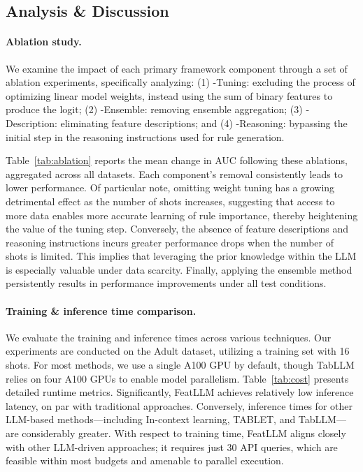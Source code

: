 \subsection{Analysis \& Discussion}
\label{sec:analysis}
\paragraph{Ablation study.} We examine the impact of each primary framework component through a set of ablation experiments, specifically analyzing: (1) \textsf{-Tuning}: excluding the process of optimizing linear model weights, instead using the sum of binary features to produce the logit; (2) \textsf{-Ensemble}: removing ensemble aggregation; (3) \textsf{-Description}: eliminating feature descriptions; and (4) \textsf{-Reasoning}: bypassing the initial step in the reasoning instructions used for rule generation.

Table~\ref{tab:ablation} reports the mean change in AUC following these ablations, aggregated across all datasets. Each component’s removal consistently leads to lower performance. Of particular note, omitting weight tuning has a growing detrimental effect as the number of shots increases, suggesting that access to more data enables more accurate learning of rule importance, thereby heightening the value of the tuning step. Conversely, the absence of feature descriptions and reasoning instructions incurs greater performance drops when the number of shots is limited. This implies that leveraging the prior knowledge within the LLM is especially valuable under data scarcity. Finally, applying the ensemble method persistently results in performance improvements under all test conditions.

\vspace*{-0.12in}
\paragraph{Training \& inference time comparison.} We evaluate the training and inference times across various techniques. Our experiments are conducted on the Adult dataset, utilizing a training set with 16 shots. For most methods, we use a single A100 GPU by default, though TabLLM relies on four A100 GPUs to enable model parallelism. Table~\ref{tab:cost} presents detailed runtime metrics. Significantly, \textsf{FeatLLM} achieves relatively low inference latency, on par with traditional approaches. Conversely, inference times for other LLM-based methods—including In-context learning, TABLET, and TabLLM—are considerably greater. With respect to training time, \textsf{FeatLLM} aligns closely with other LLM-driven approaches; it requires just 30 API queries, which are feasible within most budgets and amenable to parallel execution.

